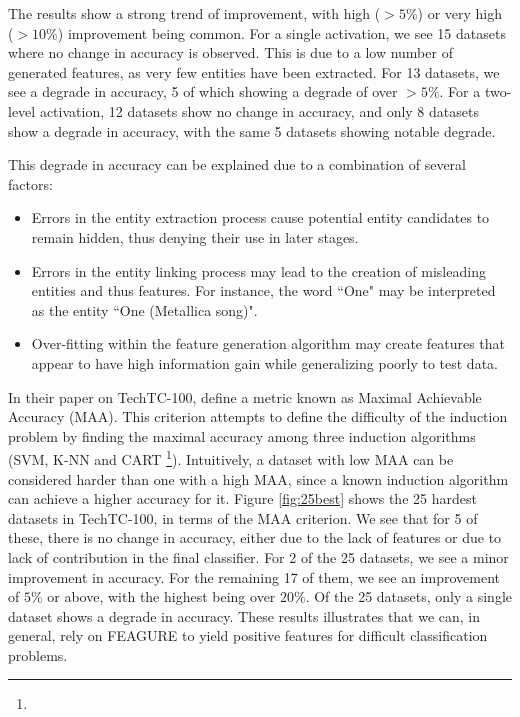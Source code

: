 \documentclass[twoside,11pt]{article}
\theoremstyle{definition}
\begin{document}
The results show a strong trend of improvement, with high ($> 5\%$) or very high ($>10\%$) improvement being common.
For a single activation, we see 15 datasets where no change in accuracy is observed. This is due to a low number of generated features, as very few entities have been extracted. For 13 datasets, we see a degrade in accuracy, 5 of which showing  a degrade of over $> 5\%$.
For a two-level activation, 12 datasets show no change in accuracy, and only 8 datasets show a degrade in accuracy, with the same 5 datasets showing notable degrade.

This degrade in accuracy can be explained due to a combination of several factors:
\begin{itemize}
	\item Errors in the entity extraction process cause potential entity candidates to remain hidden, thus denying their use in later stages.
	\item Errors in the entity linking process may lead to the creation of misleading entities and thus features. For instance, the word ``One" may be interpreted as the entity ``One (Metallica song)".
	\item Over-fitting within the feature generation algorithm may create features that appear to have high information gain while generalizing poorly to test data.
\end{itemize} 

In their paper on TechTC-100,  define a metric known as Maximal Achievable Accuracy (MAA). This criterion attempts to define the difficulty of the induction problem by finding the maximal accuracy among three induction algorithms (SVM, K-NN and CART \footnote{}).
Intuitively, a dataset with low MAA can be considered harder than one with a high MAA, since a known induction algorithm can achieve a higher accuracy for it.
Figure \ref{fig:25best} shows the 25 hardest datasets in TechTC-100, in terms of the MAA criterion. 
We see that for 5 of these, there is no change in accuracy, either due to the lack of features or due to lack of contribution in the final classifier.
For 2 of the 25 datasets, we see a minor improvement in accuracy. For the remaining 17 of them, we see an improvement of $5\%$ or above, with the highest being over $20\%$.
Of the 25 datasets, only a single dataset shows a degrade in accuracy. These results illustrates that we can, in general, rely on FEAGURE to yield positive features for difficult classification problems.
\end{document}
